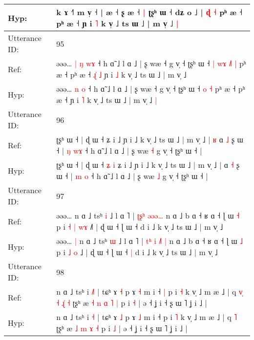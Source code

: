 \documentclass[10pt]{article}
\DeclareRobustCommand{\hl}[1]{{\textcolor{red}{#1}}}
\begin{document}
\begin{longtable}{ll}
 \\
Hyp: & k ɤ ˧\hl{˥} m v̩ ˧\hl{}\hl{}\hl{}\hl{}\hl{}\hl{} | æ ˧ ʂ æ ˧\hl{ }\hl{|} ʈʂʰ ɯ ˧ dʑ o ˩ |\hl{}\hl{}\hl{}\hl{}\hl{} \hl{}\hl{ɖ} \hl{˧} pʰ æ ˧ pʰ æ ˧\hl{}\hl{}\hl{}\hl{}\hl{} ɲ i \hl{˥} k v̩ ˩ ts ɯ ˩ | m v̩ ˩\hl{ }\hl{|}
 \\
\midrule
Utterance ID: & 95 \\
Ref: & əəə…\hl{ }\hl{|} \hl{ŋ} \hl{w}\hl{ɤ} ˧ h ɑ̃ ˩ l ɑ ˩ | ʂ wæ ˧ g v̩ ˧ ʈʂʰ ɯ ˧\hl{ }\hl{|}\hl{ }\hl{w}\hl{ɤ} \hl{˩}\hl{˥} \hl{|} pʰ æ ˧ pʰ æ ˧\hl{ }\hl{ɻ}\hl{̍}\hl{ }\hl{˩} ɲ i \hl{˩} k v̩ ˩ ts ɯ ˩ | m v̩ ˩\hl{}\hl{}
 \\
Hyp: & əəə…\hl{}\hl{} \hl{n} \hl{}\hl{o} ˧ h ɑ̃ ˩ l ɑ ˩ | ʂ wæ ˧ g v̩ ˧ ʈʂʰ ɯ ˧\hl{}\hl{}\hl{}\hl{}\hl{} \hl{}\hl{o} \hl{˧} pʰ æ ˧ pʰ æ ˧\hl{}\hl{}\hl{}\hl{}\hl{} ɲ i \hl{˥} k v̩ ˩ ts ɯ ˩ | m v̩ ˩\hl{ }\hl{|}
 \\
\midrule
Utterance ID: & 96 \\
Ref: & ʈʂʰ ɯ ˧ | ɖ ɯ ˧\hl{}\hl{}\hl{}\hl{} ʑ i ˩ ɲ i ˩ k v̩ ˩ ts ɯ ˩ | m v̩ ˩ |\hl{ }\hl{ʁ} ɑ \hl{˩} ʂ ɯ ˧ | \hl{ŋ} \hl{w}\hl{ɤ} ˧ h ɑ̃ ˩ l ɑ ˩ | ʂ wæ \hl{˧} g v̩ ˧ ʈʂʰ ɯ ˧ |
 \\
Hyp: & ʈʂʰ ɯ ˧ | ɖ ɯ ˧\hl{ }\hl{ʑ}\hl{ }\hl{i} ʑ i ˩ ɲ i ˩ k v̩ ˩ ts ɯ ˩ | m v̩ ˩ |\hl{}\hl{} ɑ \hl{˧} ʂ ɯ ˧ | \hl{m} \hl{}\hl{o} ˧ h ɑ̃ ˩ l ɑ ˩ | ʂ wæ \hl{˩} g v̩ ˧ ʈʂʰ ɯ ˧ |
 \\
\midrule
Utterance ID: & 97 \\
Ref: & əəə…\hl{}\hl{} n ɑ ˩ tsʰ \hl{i} ˩ l ɑ ˥ | \hl{}\hl{ʈ}\hl{ʂ}\hl{ʰ} \hl{ə}\hl{ə}\hl{ə}\hl{…} n ɑ ˩ b ɑ ˧ ʁ ɑ ˧ ɭ ɯ \hl{˧} p i\hl{ }\hl{˧} \hl{|} \hl{w}\hl{ɤ} ˩\hl{˥} | ɖ ɯ ˧ ɭ ɯ ˧\hl{}\hl{} d i ˩ k v̩ ˩ ts ɯ ˩ | m v̩ ˩
 \\
Hyp: & əəə…\hl{ }\hl{|} n ɑ ˩ tsʰ \hl{ɯ} ˩ l ɑ ˥ | \hl{t}\hl{ʰ}\hl{ }\hl{i} \hl{˩}\hl{˥}\hl{ }\hl{|} n ɑ ˩ b ɑ ˧ ʁ ɑ ˧ ɭ ɯ \hl{˩} p i\hl{}\hl{} \hl{˩} \hl{}\hl{o} ˩\hl{} | ɖ ɯ ˧ ɭ ɯ ˧\hl{ }\hl{|} d i ˩ k v̩ ˩ ts ɯ ˩ | m v̩ ˩
 \\
\midrule
Utterance ID: & 98 \\
Ref: & n ɑ ˩ tsʰ i \hl{˩}\hl{˥} | tɕʰ ɤ \hl{˧} p ɤ \hl{˧} m i ˧\hl{ }\hl{|} p i \hl{˧} k v̩ ˩ m æ ˩ | q\hl{ }\hl{v}\hl{̩}\hl{ }\hl{˧}\hl{ }\hl{ɻ}\hl{̍} \hl{˧} ʈʂʰ æ\hl{ }\hl{˧} \hl{n} \hl{ɑ} \hl{˥} \hl{|} p i \hl{˧} | ə ˧ ʝ i ˧ ʂ ɯ ˥ ʝ i ˩ |
 \\
Hyp: & n ɑ ˩ tsʰ i \hl{}\hl{˧} | tɕʰ ɤ \hl{˩} p ɤ \hl{˩} m i ˧\hl{}\hl{} p i \hl{˥} k v̩ ˩ m æ ˩ | q\hl{}\hl{}\hl{}\hl{}\hl{}\hl{}\hl{}\hl{} \hl{˥} ʈʂʰ æ\hl{}\hl{} \hl{˩} \hl{m} \hl{ɤ} \hl{˧} p i \hl{˩} | ə ˧ ʝ i ˧ ʂ ɯ ˥ ʝ i ˩ |

\end{longtable}
\end{document}
